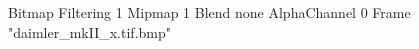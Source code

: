 {Bitmap
	{Filtering 1}
	{Mipmap 1}
	{Blend none}
	{AlphaChannel 0}
	{Frame "daimler_mkII_x.tif.bmp"}
}
